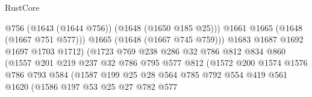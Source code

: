 \begin{lexlean}{RustCore}
\begin{coremodule}
                                          @756
                                          (@1643 (@1644 @756))
                                          (@1648 (@1650 @185 @25)))
                                        @1661
                                        @1665
                                        (@1648 (@1667 @751 @577)))
                                      @1665
                                      (@1648 (@1667 @745 @759)))
                                    @1683
                                    @1687
                                    @1692
                                    @1697
                                    @1703
                                    @1712)
                                  (@1723
                                    @769
                                    @238
                                    @286
                                    @32
                                    @786
                                    @812
                                    @834
                                    @860
                                    (@1557
                                      @201
                                      @219
                                      @237
                                      @32
                                      @786
                                      @795
                                      @577
                                      @812
                                      (@1572
                                        @200
                                        @1574
                                        @1576
                                        @786
                                        @793
                                        @584
                                        (@1587
                                          @199
                                          @25
                                          @28
                                          @564
                                          @785
                                          @792
                                          @554
                                          @419
                                          @561
                                          @1620
                                          (@1586
                                            @197
                                            @53
                                            @25
                                            @27
                                            @782
                                            @577

\end{coremodule}
\end{lexlean}
